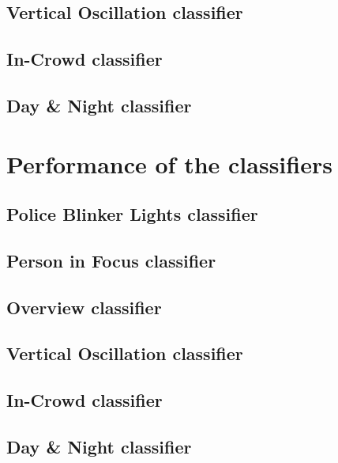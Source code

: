 \subsection{Vertical Oscillation classifier}
\subsection{In-Crowd classifier}
\subsection{Day \& Night classifier}
%
\section{Performance of the classifiers}
%
%
\subsection{Police Blinker Lights classifier}
\subsection{Person in Focus classifier}
\subsection{Overview classifier}
\subsection{Vertical Oscillation classifier}
\subsection{In-Crowd classifier}
\subsection{Day \& Night classifier}
%

